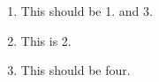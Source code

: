 \documentclass{article}
\begin{document}
\begin{enumerate}
    \item This should be 1. and 3.
    \item This is 2.
    \item This should be four.
\end{enumerate}
\end{document}
